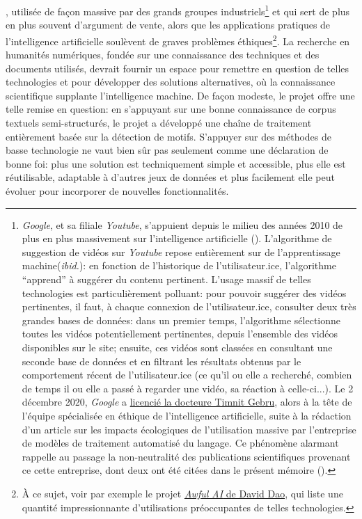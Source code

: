 {}, utilisée de façon massive par des grands groupes industriels\footnote{
	\textit{Google}, et sa filiale \textit{Youtube}, s'appuient depuis le milieu des années 2010 de plus en plus massivement sur l'intelligence artificielle (\cite[p. 1]{covington_deep_2016}). L'algorithme de suggestion de vidéos sur \textit{Youtube} repose entièrement sur de l'apprentissage machine(\textit{ibid.}): en fonction de l'historique de l'utilisateur.ice, l'algorithme \enquote{apprend} à suggérer du contenu pertinent. L'usage massif de telles technologies est particulièrement polluant: pour pouvoir suggérer des vidéos pertinentes, il faut, à chaque connexion de l'utilisateur.ice, consulter deux très grandes bases de données: dans un premier temps, l'algorithme sélectionne toutes les vidéos potentiellement pertinentes, depuis l'ensemble des vidéos disponibles sur le site; ensuite, ces vidéos sont classées en consultant une seconde base de données et en filtrant les résultats obtenus par le comportement récent de l'utilisateur.ice (ce qu'il ou elle a recherché, combien de temps il ou elle a passé à regarder une vidéo, sa réaction à celle-ci...). Le 2 décembre 2020, \textit{Google} a \href{https://googlewalkout.medium.com/setting-the-record-straight-isupporttimnit-believeblackwomen-5d7bbfe4ed90}{licencié la docteure Timnit Gebru}, alors à la tête de l'équipe spécialisée en éthique de l'intelligence artificielle, suite à la rédaction d'un article sur les impacts écologiques de l'utilisation massive par l'entreprise de modèles de traitement automatisé du langage. Ce phénomène alarmant rappelle au passage la non-neutralité des publications scientifiques provenant ce cette entreprise, dont deux ont été citées dans le présent mémoire (\cite{mikolov_efficient_2013, covington_deep_2016}).
} et qui sert de plus en plus souvent d'argument de vente, alors que les applications pratiques de l'intelligence artificielle soulèvent de graves problèmes éthiques\footnote{
	À ce sujet, voir par exemple le projet \href{https://github.com/daviddao/awful-ai}{\textit{Awful AI} de David Dao}, qui liste une quantité impressionnante d'utilisations préoccupantes de telles technologies.
}. La recherche en humanités numériques, fondée sur une connaissance des techniques et des documents utilisés, devrait fournir un espace pour remettre en question de telles technologies et pour développer des solutions alternatives, où la connaissance scientifique supplante l'intelligence machine. De façon modeste, le projet \mssktb{} offre une telle remise en question: en s'appuyant sur une bonne connaissance de corpus textuels semi-structurés, le projet a développé une chaîne de traitement entièrement basée sur la détection de motifs. S'appuyer sur des méthodes de basse technologie ne vaut bien sûr pas seulement comme une déclaration de bonne foi: plus une solution est techniquement simple et accessible, plus elle est réutilisable, adaptable à d'autres jeux de données et plus facilement elle peut évoluer pour incorporer de nouvelles fonctionnalités. 

